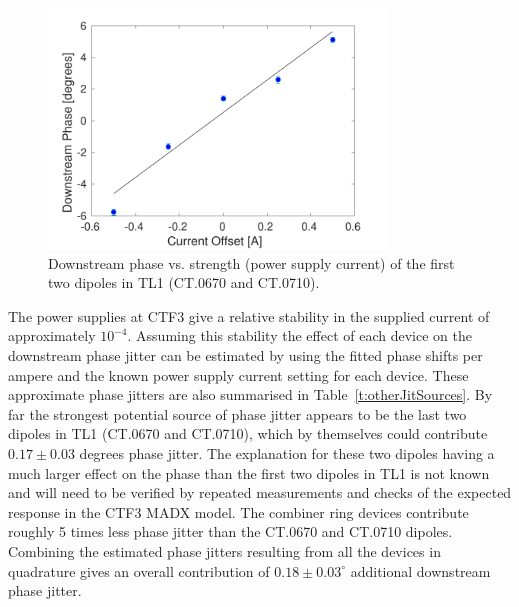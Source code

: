 
\begin{figure}
  \centering
  \includegraphics[width=0.8\textwidth]{Figures/propagation/tl1670}
  \caption{Downstream phase vs. strength (power supply current) of the first two dipoles in TL1 (CT.0670 and CT.0710).}
  \label{f:tl1670}
\end{figure}



The power supplies at CTF3 give a relative stability in the supplied current of approximately \(10^{-4}\). Assuming this stability the effect of each device on the downstream phase jitter can be estimated by using the fitted phase shifts per ampere and the known power supply current setting for each device. These approximate phase jitters are also summarised in Table~\ref{t:otherJitSources}. By far the strongest potential source of phase jitter appears to be the last two dipoles in TL1 (CT.0670 and CT.0710), which by themselves could contribute \(0.17\pm0.03\) degrees phase jitter. 
The explanation for these two dipoles having a much larger effect on the phase than the first two dipoles in TL1 is not known and will need to be verified by repeated measurements and checks of the expected response in the CTF3 MADX model. The combiner ring devices contribute roughly 5 times less phase jitter than the CT.0670 and CT.0710 dipoles. 
Combining the estimated phase jitters resulting from all the devices in quadrature gives an overall contribution of \(0.18\pm0.03^\circ\) additional downstream phase jitter.

